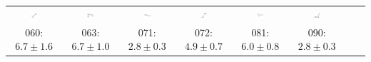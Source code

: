 \begin{tabular}{|c c c c c c c|}
\includegraphics[width = 0.14\textwidth]{2DImages/SAMPL5_027.pdf} & \includegraphics[width = 0.14\textwidth]{2DImages/SAMPL5_042.pdf} & \includegraphics[width = 0.14\textwidth]{2DImages/SAMPL5_044.pdf} & \includegraphics[width = 0.14\textwidth]{2DImages/SAMPL5_046.pdf} & \includegraphics[width = 0.14\textwidth]{2DImages/SAMPL5_047.pdf} & \includegraphics[width = 0.14\textwidth]{2DImages/SAMPL5_048.pdf} & \includegraphics[width = 0.14\textwidth]{2DImages/SAMPL5_056.pdf} \\ 
{\scriptsize 060: $ 6.7 \pm 1.6 $ } & {\scriptsize 063: $ 6.7 \pm 1.0 $ } & {\scriptsize 071: $ 2.8 \pm 0.3 $ } & {\scriptsize 072: $ 4.9 \pm 0.7 $ } & {\scriptsize 081: $ 6.0 \pm 0.8 $ } & {\scriptsize 090: $ 2.8 \pm 0.3 $ } & \\ 

\end{tabular}
